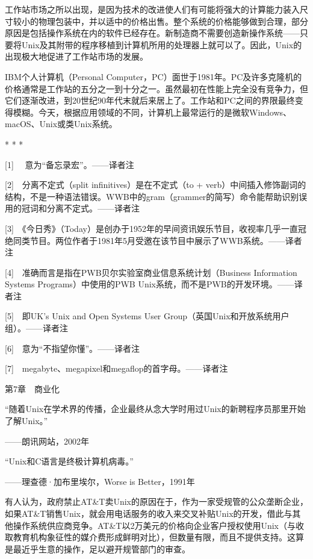 \documentclass[a4paper,12pt,UTF8,twoside]{ctexbook}
\begin{document}
{{工作站市场之所以出现，是因为技术的改进使人们有可能将强大的计算能力装入尺寸较小的物理包装中，并以适中的价格出售。整个系统的价格能够做到合理，部分原因是包括操作系统在内的软件已经存在。新制造商不需要创造新操作系统——只要将Unix及其附带的程序移植到计算机所用的处理器上就可以了。因此，Unix的出现极大地促进了工作站市场的发展。

IBM个人计算机（Personal Computer，PC）面世于1981年。PC及许多克隆机的价格通常是工作站的五分之一到十分之一。虽然最初在性能上完全没有竞争力，但它们逐渐改进，到20世纪90年代末就后来居上了。工作站和PC之间的界限最终变得模糊。今天，根据应用领域的不同，计算机上最常运行的是微软Windows、macOS、Unix或类Unix系统。



* * *



[1]　 意为“备忘录宏”。——译者注

[2]　分离不定式（split infinitives）是在不定式（to + verb）中间插入修饰副词的结构，不是一种语法错误。WWB中的gram（grammer的简写）命令能帮助识别误用的冠词和分离不定式。——译者注

[3]　《今日秀》（Today）是创办于1952年的早间资讯娱乐节目，收视率几乎一直冠绝同类节目。两位作者于1981年5月受邀在该节目中展示了WWB系统。——译者注

[4]　准确而言是指在PWB贝尔实验室商业信息系统计划（Business Information Systems Programs）中使用的PWB Unix系统，而不是PWB的开发环境。——译者注

[5]　即UK’s Unix and Open Systems User Group（英国Unix和开放系统用户组）。——译者注

[6]　意为“不指望你懂”。——译者注

[7]　megabyte、megapixel和megaflop的首字母。——译者注





第7章　商业化


“随着Unix在学术界的传播，企业最终从念大学时用过Unix的新聘程序员那里开始了解Unix。”

——朗讯网站，2002年

“Unix和C语言是终极计算机病毒。”

——理查德·加布里埃尔，Worse is Better，1991年

有人认为，政府禁止AT\&T卖Unix的原因在于，作为一家受规管的公众垄断企业，如果AT\&T销售Unix，就会用电话服务的收入来交叉补贴Unix的开发，借此与其他操作系统供应商竞争。AT\&T以2万美元的价格向企业客户授权使用Unix（与收取教育机构象征性的媒介费形成鲜明对比），但数量有限，而且不提供支持。这算是最近乎生意的操作，足以避开规管部门的审查。





}}
\end{document}
